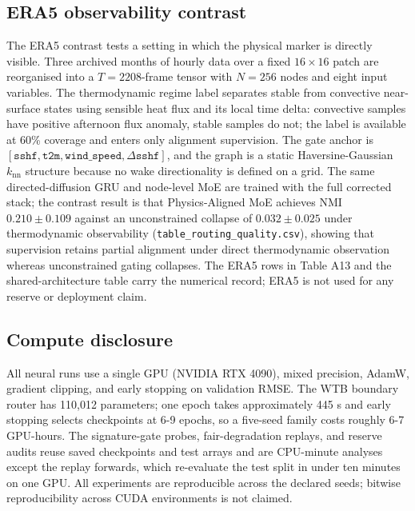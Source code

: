 \documentclass[
  journal]{IEEEtran}
\begin{document}
\FloatBarrier

\subsection*{ERA5 observability
contrast}\label{era5-observability-contrast}

The ERA5 contrast tests a setting in which the physical marker is
directly visible. Three archived months of hourly data over a fixed
\(16\times16\) patch are reorganised into a \(T{=}2208\)-frame tensor
with \(N{=}256\) nodes and eight input variables. The thermodynamic
regime label separates stable from convective near-surface states using
sensible heat flux and its local time delta: convective samples have
positive afternoon flux anomaly, stable samples do not; the label is
available at 60\% coverage and enters only alignment supervision. The
gate anchor is
\([\texttt{sshf}, \texttt{t2m}, \texttt{wind\_speed}, \Delta\texttt{sshf}]\),
and the graph is a static Haversine-Gaussian \(k_{\mathrm{nn}}\)
structure because no wake directionality is defined on a grid. The same
directed-diffusion GRU and node-level MoE are trained with the full
corrected stack; the contrast result is that Physics-Aligned MoE
achieves NMI \(0.210 \pm 0.109\) against an unconstrained collapse of
\(0.032 \pm 0.025\) under thermodynamic observability
(\texttt{table\_routing\_quality.csv}), showing that supervision retains
partial alignment under direct thermodynamic observation whereas
unconstrained gating collapses. The ERA5 rows in Table A13 and the
shared-architecture table carry the numerical record; ERA5 is not used
for any reserve or deployment claim.

\FloatBarrier

\subsection*{Compute disclosure}\label{compute-disclosure}

All neural runs use a single GPU (NVIDIA RTX 4090), mixed precision,
AdamW, gradient clipping, and early stopping on validation RMSE. The WTB
boundary router has 110,012 parameters; one epoch takes approximately
445 s and early stopping selects checkpoints at 6-9 epochs, so a
five-seed family costs roughly 6-7 GPU-hours. The signature-gate probes,
fair-degradation replays, and reserve audits reuse saved checkpoints and
test arrays and are CPU-minute analyses except the replay forwards,
which re-evaluate the test split in under ten minutes on one GPU. All
experiments are reproducible across the declared seeds; bitwise
reproducibility across CUDA environments is not claimed.
\end{document}
